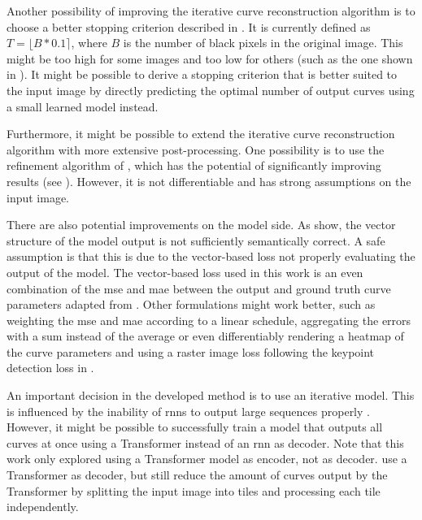 Another possibility of improving the iterative curve reconstruction algorithm is to choose a better stopping criterion described in . It is currently defined as $T=\lfloor B*0.1 \rceil$, where $B$ is the number of black pixels in the original image. This might be too high for some images and too low for others (such as the one shown in ). It might be possible to derive a stopping criterion that is better suited to the input image by directly predicting the optimal number of output curves using a small learned model instead.

Furthermore, it might be possible to extend the iterative curve reconstruction algorithm with more extensive post-processing. One possibility is to use the refinement algorithm of \citet{DBLP:conf/eccv/EgiazarianVAVST20}, which has the potential of significantly improving results (see ). However, it is not differentiable and has strong assumptions on the input image.

There are also potential improvements on the model side. As  show, the vector structure of the model output is not sufficiently semantically correct. A safe assumption is that this is due to the vector-based loss not properly evaluating the output of the model. The vector-based loss used in this work is an even combination of the \gls{mse} and \gls{mae} between the output and ground truth curve parameters adapted from \citet{DBLP:conf/eccv/EgiazarianVAVST20}. Other formulations might work better, such as weighting the \gls{mse} and \gls{mae} according to a linear schedule, aggregating the errors with a sum instead of the average or even differentiably rendering a heatmap of the curve parameters and using a raster image loss following the keypoint detection loss in \citet{Puhachov2021KeypointPolyvector}.

An important decision in the developed method is to use an iterative model. This is influenced by the inability of \glspl{rnn} to output large sequences properly \citep{hochreiterdipl,Bengio:1994:LLD:2325857.2328340}. However, it might be possible to successfully train a model that outputs all curves at once using a Transformer \citep{DBLP:conf/nips/VaswaniSPUJGKP17} instead of an \gls{rnn} as decoder. Note that this work only explored using a Transformer model as encoder, not as decoder. \citet{DBLP:conf/eccv/EgiazarianVAVST20} use a Transformer as decoder, but still reduce the amount of curves output by the Transformer by splitting the input image into tiles and processing each tile independently.

